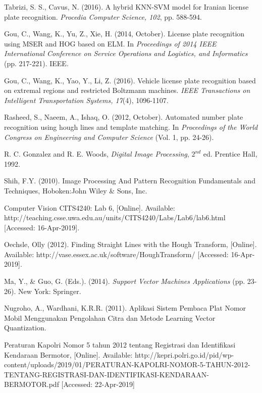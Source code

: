 \begin{thebibliography}{7}

{Tabrizi, S. S., Cavus, N. (2016). A hybrid KNN-SVM model for Iranian license plate recognition. \emph{Procedia Computer Science, 102}, pp. 588-594.}

{Gou, C., Wang, K., Yu, Z., Xie, H. (2014, October). License plate recognition using MSER and HOG based on ELM. In \emph{Proceedings of 2014 IEEE International Conference on Service Operations and Logistics, and Informatics} (pp. 217-221). IEEE.}

{Gou, C., Wang, K., Yao, Y., Li, Z. (2016). Vehicle license plate recognition based on extremal regions and restricted Boltzmann machines. \emph{IEEE Transactions on Intelligent Transportation Systems, 17}(4), 1096-1107.}

{Rasheed, S., Naeem, A., Ishaq, O. (2012, October). Automated number plate recognition using hough lines and template matching. In \emph{Proceedings of the World Congress on Engineering and Computer Science} (Vol. 1, pp. 24-26).}

{R. C. Gonzalez and R. E. Woods, \emph{Digital Image Processing}, $2^{nd}$ ed. Prentice Hall, 1992.}

{Shih, F.Y. (2010). Image Processing And Pattern Recognition Fundamentals and Techniques, Hoboken:John Wiley \& Sons, Inc.}

{Computer Vision CITS4240: Lab 6, [Online]. Available: http://teaching.csse.uwa.edu.au/units/CITS4240/Labs/Lab6/lab6.html [Accessed: 16-Apr-2019].}

{Oechsle, Olly (2012). Finding Straight Lines with the Hough Transform, [Online]. Available: http://vase.essex.ac.uk/software/HoughTransform/ [Accessed: 16-Apr-2019].}

{Ma, Y., \& Guo, G. (Eds.). (2014). \textit{Support Vector Machines Applications} (pp. 23-26). New York: Springer.}

{Nugroho, A., Wardhani, K.R.R. (2011). Aplikasi Sistem Pembaca Plat Nomor Mobil Menggunakan Pengolahan Citra dan Metode Learning Vector Quantization.}

{Peraturan Kapolri Nomor 5 tahun 2012 tentang Registrasi dan Identifikasi Kendaraan Bermotor, [Online]. Available: http://kepri.polri.go.id/pid/wp-content/uploads/2019/01/PERATURAN-KAPOLRI-NOMOR-5-TAHUN-2012-TENTANG-REGISTRASI-DAN-IDENTIFIKASI-KENDARAAN-BERMOTOR.pdf [Accessed: 22-Apr-2019]}


\end{thebibliography}
